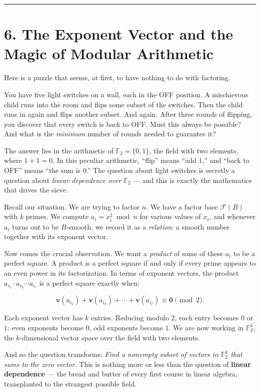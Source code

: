 \bigskip\noindent\rule{\linewidth}{0.4pt}\bigskip

\section{6. The Exponent Vector and the Magic of Modular Arithmetic}
Here is a puzzle that seems, at first, to have nothing to do with factoring.

You have five light switches on a wall, each in the OFF position. A mischievous child runs into the room and flips some subset of the switches. Then the child runs in again and flips another subset. And again. After three rounds of flipping, you discover that every switch is back to OFF. Must this always be possible? And what is the \emph{minimum} number of rounds needed to guarantee it?

The answer lies in the arithmetic of \(\mathbb{F}_2 = \{0, 1\}\), the field with two elements, where \(1 + 1 = 0\). In this peculiar arithmetic, ``flip'' means ``add \(1\),'' and ``back to OFF'' means ``the sum is \(0\).'' The question about light switches is secretly a question about \emph{linear dependence over \(\mathbb{F}_2\)} --- and this is exactly the mathematics that drives the sieve.

Recall our situation. We are trying to factor \(n\). We have a factor base \(\mathcal{F}(B)\) with \(k\) primes. We compute \(a_i = x_i^2 \bmod n\) for various values of \(x_i\), and whenever \(a_i\) turns out to be \(B\)-smooth, we record it as a \emph{relation}: a smooth number together with its exponent vector.

Now comes the crucial observation. We want a \emph{product} of some of these \(a_i\) to be a perfect square. A product is a perfect square if and only if every prime appears to an even power in its factorization. In terms of exponent vectors, the product \(a_{i_1} \cdot a_{i_2} \cdots a_{i_r}\) is a perfect square exactly when:

\[\mathbf{v}(a_{i_1}) + \mathbf{v}(a_{i_2}) + \cdots + \mathbf{v}(a_{i_r}) \equiv \mathbf{0} \pmod{2}.\]

Each exponent vector has \(k\) entries. Reducing modulo \(2\), each entry becomes \(0\) or \(1\): even exponents become \(0\), odd exponents become \(1\). We are now working in \(\mathbb{F}_2^k\), the \(k\)-dimensional vector space over the field with two elements.

And so the question transforms: \emph{Find a nonempty subset of vectors in \(\mathbb{F}_2^k\) that sums to the zero vector.} This is nothing more or less than the question of \textbf{linear dependence} --- the bread and butter of every first course in linear algebra, transplanted to the strangest possible field.


